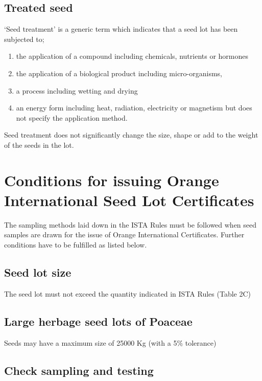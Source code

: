 \documentclass[]{book}
\begin{document}
\subsection{Treated seed}\label{treated-seed}

`Seed treatment' is a generic term which indicates that a seed lot has
been subjected to;

\begin{enumerate}
\def\labelenumi{\alph{enumi})}
\item
  the application of a compound including chemicals, nutrients or
  hormones
\item
  the application of a biological product including micro-organisms,
\item
  a process including wetting and drying
\item
  an energy form including heat, radiation, electricity or magnetism but
  does not specify the application method.
\end{enumerate}

Seed treatment does not significantly change the size, shape or add to
the weight of the seeds in the lot.

\section{Conditions for issuing Orange International Seed Lot
Certificates}\label{conditions-for-issuing-orange-international-seed-lot-certificates}

The sampling methods laid down in the ISTA Rules must be followed when
seed samples are drawn for the issue of Orange International
Certificates. Further conditions have to be fulfilled as listed below.

\subsection{Seed lot size}\label{seed-lot-size}

The seed lot must not exceed the quantity indicated in ISTA Rules (Table
2C)

\subsection{Large herbage seed lots of
Poaceae}\label{large-herbage-seed-lots-of-poaceae}

Seeds may have a maximum size of 25000 Kg (with a 5\% tolerance)

\subsection{Check sampling and
testing}\label{check-sampling-and-testing}
\end{document}
